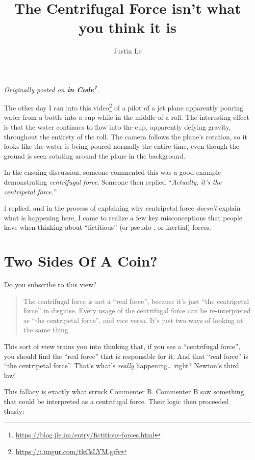 \documentclass[]{article}
\title{The Centrifugal Force isn't what you think it is}
\author{Justin Le}
\renewcommand{\href}[2]{#2\footnote{\url{#1}}}
\begin{document}
\maketitle

\emph{Originally posted on
\textbf{\href{https://blog.jle.im/entry/fictitious-forces.html}{in Code}}.}

The other day I ran into \href{https://i.imgur.com/tkCsLYM.gifv}{this video} of
a pilot of a jet plane apparently pouring water from a bottle into a cup while
in the middle of a roll. The interesting effect is that the water continues to
flow into the cup, apparently defying gravity, throughout the entirety of the
roll. The camera follows the plane's rotation, so it looks like the water is
being poured normally the entire time, even though the ground is seen rotating
around the plane in the background.

In the ensuing discussion, someone commented this was a good example
demonstrating \emph{centrifugal force}. Someone then replied ``\emph{Actually,
it's the centripetal force.}''

I replied, and in the process of explaining why centripetal force \emph{doesn't}
explain what is happening here, I came to realize a few key misconceptions that
people have when thinking about ``fictitious'' (or pseudo-, or inertial) forces.

\hypertarget{two-sides-of-a-coin}{%
\section{Two Sides Of A Coin?}\label{two-sides-of-a-coin}}

Do you subscribe to this view?

\begin{quote}
The centrifugal force is not a ``real force'', because it's just ``the
centripetal force'' in disguise. Every usage of the centrifugal force can be
re-interpreted as ``the centripetal force'', and vice versa. It's just two ways
of looking at the same thing.
\end{quote}

This sort of view trains you into thinking that, if you see a ``centrifugal
force'', you should find the ``real force'' that is responsible for it. And that
``real force'' is ``the centripetal force''. That's what's \emph{really}
happening\ldots{} right? Newton's third law!

This fallacy is exactly what struck Commenter B. Commenter B saw something that
could be interpreted as a centrifugal force. Their logic then proceeded thusly:
\end{document}
